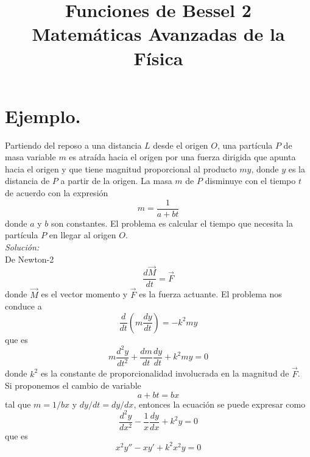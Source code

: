 
\usepackage{mathrsfs}
\usepackage{tikz}
\usepackage{bigints}
\title{Funciones de Bessel 2 \\ {\large Matemáticas Avanzadas de la Física}}
\date{ }

\renewcommand\labelenumii{\theenumi.{\arabic{enumii}}}
\maketitle
\fontsize{14}{14}\selectfont
\section{Ejemplo.}
Partiendo del reposo a una distancia $L$ desde el origen $O$, una partícula $P$ de masa variable $m$ es atraída hacia el origen por una fuerza dirigida que apunta hacia el origen y que tiene magnitud proporcional al producto $my$, donde $y$ es la distancia de $P$ a partir de la origen. La masa $m$ de $P$ disminuye con el tiempo $t$ de acuerdo con la expresión
\begin{equation}
m = \dfrac{1}{a + bt}
\end{equation}
donde $a$ y $b$ son constantes. El problema es calcular el tiempo que necesita la partícula $P$ en llegar al origen $O$.
\\
\emph{Solución: }
\\
De Newton-2
\begin{equation}
\dfrac{d\overrightarrow{M}}{dt} = \overrightarrow{F}
\end{equation}
donde $\overrightarrow{M}$ es el vector momento y $\overrightarrow{F}$ es la fuerza actuante. El problema nos conduce a
\begin{equation}
\dfrac{d}{dt} \left( m \dfrac{dy}{dt} \right) = - k^{2} m y
\end{equation}
que es
\begin{equation}
m\dfrac{d^{2} y}{dt^{2}}+ \dfrac{dm}{dt}\dfrac{dy}{dt} + k^{2} m y = 0
\end{equation}
donde $k^{2}$ es la constante de proporcionalidad involucrada en la magnitud de $\overrightarrow{F}$.
\\
Si proponemos el cambio de variable
\begin{equation}
a + bt = bx
\end{equation}
tal que $m=1/bx$ y $dy/dt = dy/dx$, entonces la ecuación se puede expresar como
\begin{equation}
\dfrac{d^{2} y}{d x^{2}} - \dfrac{1}{x} \dfrac{dy}{dx} + k^{2} y = 0
\end{equation}
que es
\begin{equation}
x^{2} y'' - xy' + k^{2}x^{2} y = 0
\end{equation}
